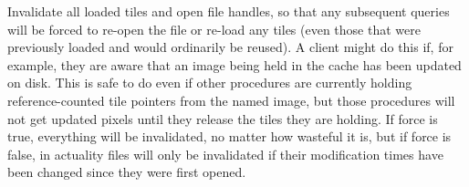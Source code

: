 Invalidate all loaded tiles and open file handles, so that any
subsequent queries will be forced to re-open the file or re-load any
tiles (even those that were previously loaded and would ordinarily be
reused).  A client might do this if, for example, they are aware that an
image being held in the cache has been updated on disk.  This is safe to
do even if other procedures are currently holding reference-counted tile
pointers from the named image, but those procedures will not get updated
pixels until they release the tiles they are holding.  If force is true,
everything will be invalidated, no matter how wasteful it is, but if
force is false, in actuality files will only be invalidated if their
modification times have been changed since they were first opened.
\apiend


\chapwidthend
